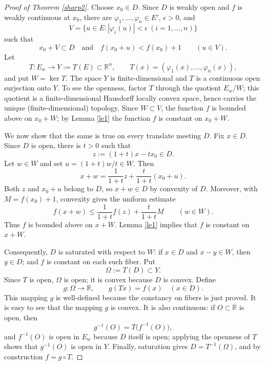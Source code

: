 \documentclass[12pt]{amsart}
\theoremstyle{plain}
\theoremstyle{definition}
\theoremstyle{remark}
\def\R{{\mathbb R}}
\begin{document}
\begin{proof}[Proof of Theorem \ref{sharp2}]
Choose $x_0\in D$.  Since $D$ is weakly open and $f$ is weakly continuous at $x_0$, there are $\varphi_1,\ldots,\varphi_n\in E'$, $\epsilon>0$, and
\[
        V=\{u\in E: |\varphi_i(u)|<\epsilon\ (i=1,\ldots,n)\}
\]
such that
\[
        x_0+V\subset D
        \quad\text{and}\quad
        f(x_0+u)< f(x_0)+1\qquad (u\in V).
\]
Let
\[
        T\colon E_{w}\longrightarrow Y:=T(E)\subset\R^n,
        \qquad
        T(x)=(\varphi_1(x),\ldots,\varphi_n(x)),
\]
and put $W=\ker T$.  The space $Y$ is finite-dimensional  and $T$ is a continuous open surjection onto $Y$.  To see the openness, factor $T$ through the quotient $E_{w}/W$; this quotient is a finite-dimensional Hausdorff locally convex space, hence carries the unique (finite-dimensional) topology.  Since $W\subset V$, the function $f$ is bounded above on $x_0+W$; by  Lemma \ref{le1} the function  $f$ is constant on $x_0+W$.

We now show that the same is true on every translate meeting $D$.  Fix $x\in D$.  Since $D$ is open, there is $t>0$ such that
\[
        z:=(1+t)x-tx_0\in D.
\]
Let $w\in W$ and set $u=(1+t)w/t\in W$.  Then
\[
        x+w=\frac{1}{1+t}z+\frac{t}{1+t}(x_0+u).
\]
Both $z$ and $x_0+u$ belong to $D$, so $x+w\in D$ by convexity of $D$.  Moreover, with $M=f(x_0)+1$, convexity gives the uniform estimate
\[
        f(x+w)
        \leq \frac{1}{1+t}f(z)+\frac{t}{1+t}M
        \qquad (w\in W).
\]
Thus $f$ is bounded above on $x+W$.  Lemma \ref{le1} implies that $f$ is constant on $x+W$.

Consequently, $D$ is saturated with respect to $W$: if $x\in D$ and $x-y\in W$, then $y\in D$; and $f$ is constant on each such fiber.  Put
\[
        \Omega:=T(D)\subset Y.
\]
Since $T$ is open, $\Omega$ is open; it is convex because $D$ is convex.  Define
\[
        g\colon\Omega\to\R,
        \qquad
        g(Tx)=f(x)\quad (x\in D).
\]
This mapping $g$ is well-defined because the constancy on fibers is just proved.  It is easy to see that the mapping $g$ is convex.  It is also continuous: if $O\subset\R$ is open, then
\[
        g^{-1}(O)=T\bigl(f^{-1}(O)\bigr),
\]
and $f^{-1}(O)$ is open in $E_{w}$ because $D$ itself is open; applying the openness of $T$ shows that $g^{-1}(O)$ is open in $Y$.  Finally, saturation gives $D=T^{-1}(\Omega)$, and by construction $f=g\circ T$.
\end{proof}
\end{document}
